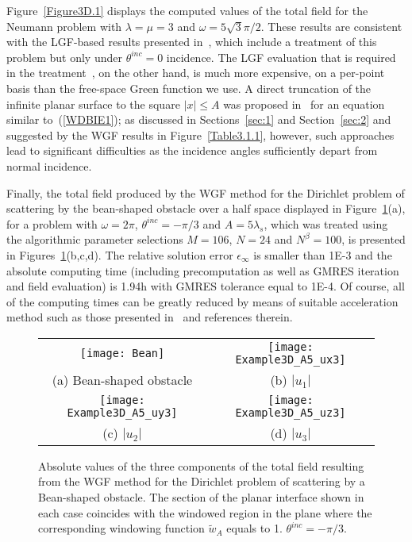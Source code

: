\documentclass[10pt]{article}
\numberwithin{equation}{section}
\begin{document}
Figure~\ref{Figure3D.1} displays the computed values of the total
field for the Neumann problem with $\lambda=\mu=3$ and
$\omega=5\sqrt{3}\pi/2$. These results are consistent with the LGF-based
results presented in~\cite{CB13}, which include a treatment of this
problem but only under $\theta^{inc}=0$ incidence. The LGF evaluation
that is required in the treatment~\cite{CB14}, on the other hand, is
much more expensive, on a per-point basis than the free-space Green
function we use.  A direct truncation of the infinite planar surface
to the square $|x|\le A$  was proposed in~\cite{CBS08,CB13} for
an equation similar to~(\ref{WDBIE1}); as discussed in Sections~\ref{sec:1} and Section~\ref{sec:2} and suggested by the WGF results
in Figure~\ref{Table3.1.1}, however, such approaches lead to significant difficulties as the incidence angles sufficiently depart from normal incidence.


Finally, the total field produced by the WGF method for the Dirichlet
problem of scattering by the bean-shaped obstacle over a half space
displayed in Figure~\ref{Figure3D.3}(a), for a problem with
$\omega=2\pi$, $\theta^{inc}=-\pi/3$ and $A=5\lambda_s$, which was
treated using the algorithmic parameter selections $M=106$, $N=24$ and
$N^\beta=100$, is presented in Figures~\ref{Figure3D.3}(b,c,d). The
relative solution error $\epsilon_\infty$ is smaller than 1E-3 and the
absolute computing time (including precomputation as well as GMRES
iteration and field evaluation) is 1.94h with GMRES tolerance equal to
1E-4. Of course, all of the computing times can be greatly reduced by
means of suitable acceleration method such as those presented
in~\cite{CB14,BK01} and references therein.

\begin{figure}[htb]
\centering
\begin{tabular}{cc}
\texttt{[image: Bean]} &
\texttt{[image: Example3D\_A5\_ux3]} \\
(a) Bean-shaped obstacle & (b) $|u_1|$ \\
\texttt{[image: Example3D\_A5\_uy3]} &
\texttt{[image: Example3D\_A5\_uz3]} \\
(c) $|u_2|$ & (d) $|u_3|$ \\
\end{tabular}
\caption{Absolute values of the three components of the total field  resulting from the WGF method for the Dirichlet problem of scattering by a Bean-shaped obstacle. The section of the planar interface shown in each case coincides with the windowed region in the plane where the corresponding windowing function $\widetilde{w}_A$ equals to 1. $\theta^{inc}=-\pi/3$.}
\label{Figure3D.3}
\end{figure}
\end{document}
